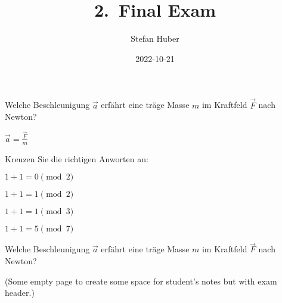 \documentclass[twoside,exam,showanswers]{exsheet2}
\title{2.\ Final Exam}
\date{2022-10-21}
\author{Stefan Huber}
\institute{Department IT}
\begin{document}
\maketitle


\begin{exercise}[6]
  Welche Beschleunigung $\vec{a}$ erfährt eine träge Masse $m$ im Kraftfeld
  $\vec{F}$ nach Newton?
  \vspace{2cm}
\end{exercise}

\begin{answer}
  $\vec{a} = \frac{\vec{F}}{m}$
\end{answer}


\begin{exercise}[4]
  Kreuzen Sie die richtigen Anworten an:
  \begin{choices}
    \item $1 + 1 = 0 \pmod 2$
    \item $1 + 1 = 1 \pmod 2$
    \item $1 + 1 = 1 \pmod 3$
    \item $1 + 1 = 5 \pmod 7$
  \end{choices}
\end{exercise}


\begin{exercise}[1]
  Welche Beschleunigung $\vec{a}$ erfährt eine träge Masse $m$ im Kraftfeld
  $\vec{F}$ nach Newton?
  \vspace{2cm}
\end{exercise}


\newpage\null
(Some empty page to create some space for student's notes but with exam header.)
\newpage\null
\end{document}
